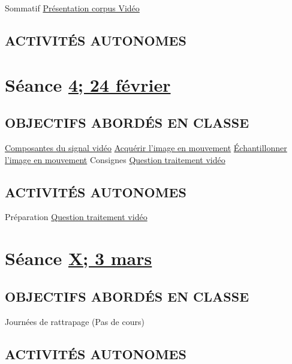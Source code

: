 \documentclass[
  french,
]{book}
\begin{document}
Sommatif \protect\hyperlink{sommatif_1}{Présentation corpus Vidéo}

\hypertarget{activituxe9s-autonomes-2}{%
\subsection{ACTIVITÉS AUTONOMES}\label{activituxe9s-autonomes-2}}

\hypertarget{semaine_4}{%
\section{\texorpdfstring{Séance \protect\hyperlink{semaine_4}{4; 24 février}}{Séance 4; 24 février}}\label{semaine_4}}

\hypertarget{objectifs-aborduxe9s-en-classe-3}{%
\subsection{OBJECTIFS ABORDÉS EN CLASSE}\label{objectifs-aborduxe9s-en-classe-3}}

\protect\hyperlink{lexique}{Composantes du signal vidéo}
\protect\hyperlink{acquerir}{Acquérir l'image en mouvement}
\protect\hyperlink{echantillonner}{Échantillonner l'image en mouvement}
Consignes \protect\hyperlink{sommatif_2}{Question traitement vidéo}

\hypertarget{activituxe9s-autonomes-3}{%
\subsection{ACTIVITÉS AUTONOMES}\label{activituxe9s-autonomes-3}}

Préparation \protect\hyperlink{sommatif_2}{Question traitement vidéo}

\hypertarget{semaine_5}{%
\section{\texorpdfstring{Séance \protect\hyperlink{semaine_5}{X; 3 mars}}{Séance X; 3 mars}}\label{semaine_5}}

\hypertarget{objectifs-aborduxe9s-en-classe-4}{%
\subsection{OBJECTIFS ABORDÉS EN CLASSE}\label{objectifs-aborduxe9s-en-classe-4}}

Journées de rattrapage (Pas de cours)

\hypertarget{activituxe9s-autonomes-4}{%
\subsection{ACTIVITÉS AUTONOMES}\label{activituxe9s-autonomes-4}}
\end{document}

